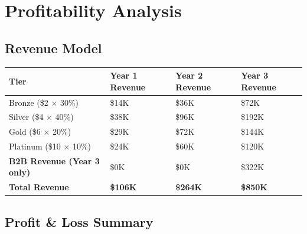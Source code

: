 \documentclass[11pt,a4paper]{article}
\begin{document}
\newpage

\section*{\textcolor{miloprimary}{Profitability Analysis}}

\subsection*{\textcolor{milosecondary}{Revenue Model}}

\begin{center}
\renewcommand{\arraystretch}{1.5}
\begin{tabular}{>{\raggedright\arraybackslash}p{4cm} >{\centering\arraybackslash}p{3cm} >{\centering\arraybackslash}p{3cm} >{\centering\arraybackslash}p{3cm}}
\toprule
\rowcolor{miloprimary!15}
\textbf{Tier} & \textbf{Year 1 Revenue} & \textbf{Year 2 Revenue} & \textbf{Year 3 Revenue} \\
\midrule
\rowcolor{bronzecolor!8}
Bronze (\$2 $\times$ 30\%) & \$14K & \$36K & \$72K \\
\rowcolor{silvercolor!8}
Silver (\$4 $\times$ 40\%) & \$38K & \$96K & \$192K \\
\rowcolor{goldcolor!8}
Gold (\$6 $\times$ 20\%) & \$29K & \$72K & \$144K \\
\rowcolor{platinumcolor!8}
Platinum (\$10 $\times$ 10\%) & \$24K & \$60K & \$120K \\
\midrule
\rowcolor{lightbg}
\textbf{B2B Revenue (Year 3 only)} & \$0K & \$0K & \$322K \\
\midrule
\rowcolor{successgreen!15}
\textbf{Total Revenue} & \textbf{\$106K} & \textbf{\$264K} & \textbf{\$850K} \\
\bottomrule
\end{tabular}
\end{center}

\vspace{0.5cm}

\subsection*{\textcolor{milosecondary}{Profit \& Loss Summary}}
\end{document}
